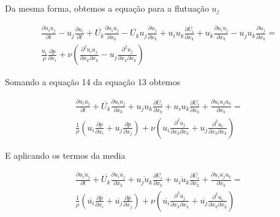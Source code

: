 \documentclass[12pt]{article}
\begin{document}
Da mesma forma, obtemos a equação para a flutuação $u_j$

\begin{equation}
	\begin{split}
		\frac{\partial u_i u_j}{\partial t} 
		- u_j \frac{\partial u_i}{\partial t} 
		+ \overline{U_k} \frac{\partial u_i u_j}{\partial x_k} 
		- \overline{U_k} u_j \frac{\partial u_j}{\partial x_k} 
		+ u_i u_k \frac{\partial \overline{U_i}}{\partial x_k} 
		+ u_k \frac{\partial u_i u_j}{\partial x_k} 
		- u_j u_k \frac{\partial u_j}{\partial x_k} 
		= \\
		\frac{u_i}{\rho} \frac{\partial p}{\partial x_i} + \nu \left(  \frac{\partial ^ 2 u_i u_j}{\partial x_k \partial x_k} - u_j\frac{\partial ^ 2 u_j}{\partial x_k \partial x_k}\right) 
	\end{split}
\end{equation}

Somando a equação 14 da equação 13 obtemos

\begin{equation}
	\begin{split}
		\frac{\partial u_i u_j}{\partial t} 		
		+ \overline{U_k} \frac{\partial u_i u_j}{\partial x_k} + u_j u_k \frac{\partial \overline{U_i}}{\partial x_k} + u_i u_k \frac{\partial \overline{U_i}}{\partial x_k} + \frac{\partial u_i u_j u_k}{\partial x_k}		
		= \\
		\frac{1}{\rho} \left( u_i\frac{\partial p}{\partial x_i} + u_j \frac{\partial p}{\partial x_j} \right) + \nu \left(  u_i\frac{\partial ^ 2  u_j}{\partial x_k \partial x_k} + u_j\frac{\partial ^ 2 u_i}{\partial x_k \partial x_k}\right) 
	\end{split}
\end{equation}

E aplicando os termos da media

\begin{equation}
	\begin{split}
		\frac{\partial \overline{u_i u_j}}{\partial t} 		
		+ \overline{U_k} \frac{\partial \overline{u_i u_j}}{\partial x_k} + \overline{u_j u_k} \frac{\partial \overline{U_i}}{\partial x_k} + \overline{u_i u_k} \frac{\partial \overline{U_i}}{\partial x_k} + \frac{\partial \overline{u_i u_j u_k}}{\partial x_k}		
		= \\
		\frac{1}{\rho} \left( \overline{u_i}\frac{\partial \overline{p}}{\partial x_i} + \overline{u_j} \frac{\partial \overline{p}}{\partial x_j} \right) + \nu \left(  \overline{u_i}\frac{\partial ^ 2  \overline{u_j}}{\partial x_k \partial x_k} + \overline
		{u_j}\frac{\partial ^ 2 \overline{u_i}}{\partial x_k \partial x_k}\right) 
	\end{split}
\end{equation}
\end{document}
